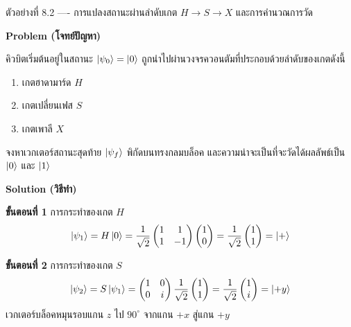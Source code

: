 \begin{psctbox}{ตัวอย่างที่ 8.2 ---- การแปลงสถานะผ่านลำดับเกต $H \to S \to X$ และการคำนวณการวัด}

\textbf{Problem (โจทย์ปัญหา)}

คิวบิตเริ่มต้นอยู่ในสถานะ $\ket{\psi_0} = \ket{0}$ ถูกนำไปผ่านวงจรควอนตัมที่ประกอบด้วยลำดับของเกตดังนี้
\begin{enumerate}
    \item เกตฮาดามาร์ด $H$
    \item เกตเปลี่ยนเฟส $S$
    \item เกตเพาลี $X$
\end{enumerate}
จงหาเวกเตอร์สถานะสุดท้าย $\ket{\psi_f}$ พิกัดบนทรงกลมบล็อค และความน่าจะเป็นที่จะวัดได้ผลลัพธ์เป็น $\ket{0}$ และ $\ket{1}$

\textbf{Solution (วิธีทำ)}

\textbf{ขั้นตอนที่ 1} การกระทำของเกต $H$
\begin{equation*}
\ket{\psi_1} = H \ket{0} = \frac{1}{\sqrt{2}}\begin{pmatrix} 1 & 1 \\ 1 & -1 \end{pmatrix} \begin{pmatrix} 1 \\ 0 \end{pmatrix} = \frac{1}{\sqrt{2}}\begin{pmatrix} 1 \\ 1 \end{pmatrix} = \ket{+}
\end{equation*}

\textbf{ขั้นตอนที่ 2} การกระทำของเกต $S$
\begin{equation*}
\ket{\psi_2} = S \ket{\psi_1} = \begin{pmatrix} 1 & 0 \\ 0 & i \end{pmatrix} \frac{1}{\sqrt{2}}\begin{pmatrix} 1 \\ 1 \end{pmatrix} = \frac{1}{\sqrt{2}}\begin{pmatrix} 1 \\ i \end{pmatrix} = \ket{+y}
\end{equation*}
เวกเตอร์บล็อคหมุนรอบแกน $z$ ไป $90^\circ$ จากแกน $+x$ สู่แกน $+y$


\end{psctbox}
